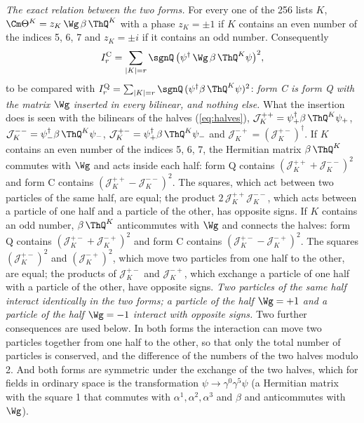 \emph{The exact relation between the two forms.} For every one of the 256 lists $K$,
$\Cm\Theta^{K}=z_K\,\Wg\,\beta\,\ThQ^{K}$ with a phase $z_K=\pm1$ if $K$ contains an even number of the
indices 5, 6, 7 and $z_K=\pm i$ if it contains an odd number. Consequently
\begin{equation}
I_r^{\mathrm C}=\sum_{|K|=r}\sgnQ\,\big(\psi^\dagger\,\Wg\,\beta\,\ThQ^{K}\psi\big)^{2},
\label{eq:forms}
\end{equation}
to be compared with $I_r^{\mathrm Q}=\sum_{|K|=r}\sgnQ\,(\psi^\dagger\beta\,\ThQ^{K}\psi)^{2}$:
\emph{form C is form Q with the matrix $\Wg$ inserted in every bilinear, and nothing else.} What the
insertion does is seen with the bilinears of the halves (\ref{eq:halves}),
$\mathcal J_K^{++}=\psi_+^\dagger\beta\,\ThQ^{K}\psi_+$,
$\mathcal J_K^{--}=\psi_-^\dagger\beta\,\ThQ^{K}\psi_-$,
$\mathcal J_K^{+-}=\psi_+^\dagger\beta\,\ThQ^{K}\psi_-$ and
$\mathcal J_K^{-+}=(\mathcal J_K^{+-})^\dagger$. If $K$ contains an even number of the indices 5, 6, 7,
the Hermitian matrix $\beta\,\ThQ^{K}$ commutes with $\Wg$ and acts inside each half: form Q contains
$(\mathcal J_K^{++}+\mathcal J_K^{--})^{2}$ and form C contains
$(\mathcal J_K^{++}-\mathcal J_K^{--})^{2}$. The squares, which act between two particles of the same
half, are equal; the product $2\,\mathcal J_K^{++}\mathcal J_K^{--}$, which acts between a particle
of one half and a particle of the other, has opposite signs. If $K$ contains an odd number,
$\beta\,\ThQ^{K}$ anticommutes with $\Wg$ and connects the halves: form Q contains
$(\mathcal J_K^{+-}+\mathcal J_K^{-+})^{2}$ and form C contains
$(\mathcal J_K^{+-}-\mathcal J_K^{-+})^{2}$. The squares $(\mathcal J_K^{+-})^{2}$ and
$(\mathcal J_K^{-+})^{2}$, which move two particles from one half to the other, are equal; the
products of $\mathcal J_K^{+-}$ and $\mathcal J_K^{-+}$, which exchange a particle of one half with a
particle of the other, have opposite signs. \emph{Two particles of the same half interact
identically in the two forms; a particle of the half $\Wg=+1$ and a particle of the half $\Wg=-1$
interact with opposite signs.} Two further consequences are used below. In both forms the
interaction can move two particles together from one half to the other, so that only the total
number of particles is conserved, and the difference of the numbers of the two halves modulo 2. And
both forms are symmetric under the exchange of the two halves, which for fields in ordinary space is
the transformation $\psi\to\gamma^{0}\gamma^{5}\psi$ (a Hermitian matrix with the square 1 that
commutes with $\alpha^{1},\alpha^{2},\alpha^{3}$ and $\beta$ and anticommutes with $\Wg$).

